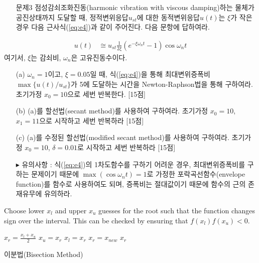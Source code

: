 \documentclass[a4,10pt]{article}
\theoremstyle{examplestyle}
\let\\\tabularnewline
\let\\\tabularnewline
\begin{document}
\begin{itemize}
\item[문제3] 점성감쇠조화진동(harmonic vibration with viscous damping)하는 물체가 공진상태까지 도달할 때, 정적변위응답$u_{st}$에 대한 동적변위응답$u(t)$는 $\xi$가 작은 경우 다음 근사식(\ref{eq:e4})과 같이 주어진다. 다음 문항에 답하여라.
\end{itemize}
\begin{align}
u(t)&\cong u_{st}\frac{1}{2\xi}\left(e^{-\xi\omega_{n}t}-1\right)\cos\omega_{n}t\label{eq:e4}
\end{align}
여기서, $\xi$는 감쇠비, $\omega_{n}$은 고유진동수이다.
\begin{itemize}
\item[(a)] $\omega_{n}=1$이고, $\xi=0.05$일 때, 식(\ref{eq:e4})을 통해 최대변위증폭비 $\max\{u(t)/u_{st}\}$가 5에 도달하는 시간을 Newton-Raphson법을 통해 구하여라. 초기가정 $x_{0}=10$으로 세번 반복한다. [15점]
\item[(b)] (a)를 할선법(secant method)를 사용하여 구하여라. 초기가정 $x_{0}=10$, $x_{1}=11$으로 시작하고 세번 반복하라 [15점]
\item[(c)] (a)를 수정된 할선법(modified secant method)를 사용하여 구하여라. 초기가정 $x_{0}=10$, $\delta=0.01$로 시작하고 세번 반복하라 [15점]
\item[$\blacktriangleright$]유의사항 : 식(\ref{eq:e4})의 1차도함수를 구하기 어려운 경우, 최대변위증폭비를 구하는 문제이기 때문에 $\max(\cos\omega_{n}t)=1$로 가정한 포락곡선함수(envelope function)를 함수로 사용하여도 되며, 증폭비는 절대값이기 때문에 함수의 근의 존재유무에 유의하라.
\end{itemize}

\clearpage

\begin{algorithm}\label{alg:c5}
Choose lower $x_{l}$ and upper $x_{u}$ guesses for the root such that the function changes sign over the interval. This can be checked by ensuring that $f(x_{l})f(x_{u})<0$.
\begin{algorithmic}
  \State $x_{r}=\frac{x_{l}+x_{u}}{2}$
    \State $x_{u}=x_{r}$
  \Else
    \State $x_{l}=x_{r}$
  \EndIf  
    \State $x_{r}=x_{new}$
    \State \Return $x_{r}$
  \EndIf
\EndWhile
\end{algorithmic}
\caption{이분법(Bisection Method)}
\end{algorithm}
\end{document}
